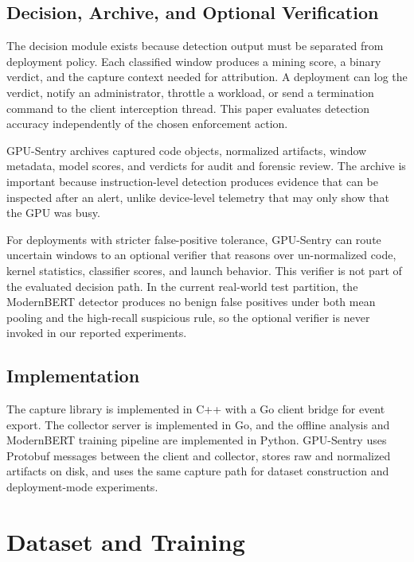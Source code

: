\subsection{Decision, Archive, and Optional Verification}
\label{sec:decision}

The decision module exists because detection output must be separated from deployment policy. Each classified window produces a mining score, a binary verdict, and the capture context needed for attribution. A deployment can log the verdict, notify an administrator, throttle a workload, or send a termination command to the client interception thread. This paper evaluates detection accuracy independently of the chosen enforcement action.

GPU-Sentry archives captured code objects, normalized artifacts, window metadata, model scores, and verdicts for audit and forensic review. The archive is important because instruction-level detection produces evidence that can be inspected after an alert, unlike device-level telemetry that may only show that the GPU was busy.

For deployments with stricter false-positive tolerance, GPU-Sentry can route uncertain windows to an optional verifier that reasons over un-normalized code, kernel statistics, classifier scores, and launch behavior. This verifier is not part of the evaluated decision path. In the current real-world test partition, the ModernBERT detector produces no benign false positives under both mean pooling and the high-recall suspicious rule, so the optional verifier is never invoked in our reported experiments.

\subsection{Implementation}
\label{sec:implementation}

The capture library is implemented in C++ with a Go client bridge for event export. The collector server is implemented in Go, and the offline analysis and ModernBERT training pipeline are implemented in Python. GPU-Sentry uses Protobuf messages between the client and collector, stores raw and normalized artifacts on disk, and uses the same capture path for dataset construction and deployment-mode experiments.

\section{Dataset and Training}
\label{sec:dataset}

